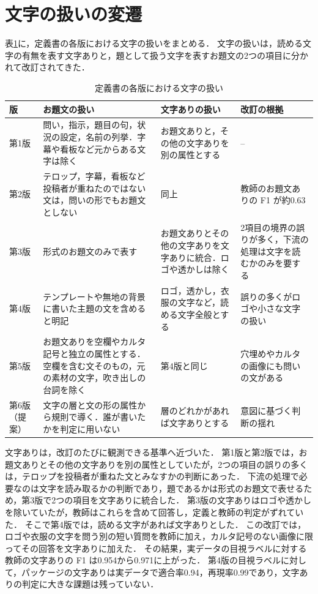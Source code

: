 \section{文字の扱いの変遷}
\label{sec_history}
表\ref{tab_history}に，定義書の各版における文字の扱いをまとめる．
文字の扱いは，読める文字の有無を表す文字ありと，題として扱う文字を表すお題文の2つの項目に分かれて改訂されてきた．

\begin{table}[t]
    \centering
    \caption{定義書の各版における文字の扱い}
    \label{tab_history}
    \small
    \begin{tabular}{>{\centering\arraybackslash}p{}>{\raggedright\arraybackslash}p{}>{\raggedright\arraybackslash}p{}>{\raggedright\arraybackslash}p{}}
        \toprule
        版 & お題文の扱い & 文字ありの扱い & 改訂の根拠 \\
        \midrule
        第1版 & 問い，指示，題目の句，状況の設定，名前の列挙．字幕や看板など元からある文字は除く & お題文ありと，その他の文字ありを別の属性とする & -- \\
        第2版 & テロップ，字幕，看板など投稿者が重ねたのではない文は，問いの形でもお題文としない & 同上 & 教師のお題文ありの F1 が約0.63 \\
        第3版 & 形式のお題文のみで表す & お題文ありとその他の文字ありを文字ありに統合．ロゴや透かしは除く & 2項目の境界の誤りが多く，下流の処理は文字を読むかのみを要する \\
        第4版 & テンプレートや無地の背景に書いた主題の文を含めると明記 & ロゴ，透かし，衣服の文字など，読める文字全般とする & 誤りの多くがロゴや小さな文字の扱い \\
        第5版 & お題文ありを空欄やカルタ記号と独立の属性とする．空欄を含む文そのもの，元の素材の文字，吹き出しの台詞を除く & 第4版と同じ & 穴埋めやカルタの画像にも問いの文がある \\
        第6版（提案） & 文字の層と文の形の属性から規則で導く．誰が書いたかを判定に用いない & 層のどれかがあれば文字ありとする & 意図に基づく判断の揺れ \\
        \bottomrule
    \end{tabular}
\end{table}

文字ありは，改訂のたびに観測できる基準へ近づいた．
第1版と第2版では，お題文ありとその他の文字ありを別の属性としていたが，2つの項目の誤りの多くは，テロップを投稿者が重ねた文とみなすかの判断にあった．
下流の処理で必要なのは文字を読み取るかの判断であり，題であるかは形式のお題文で表せるため，第3版で2つの項目を文字ありに統合した．
第3版の文字ありはロゴや透かしを除いていたが，教師はこれらを含めて回答し，定義と教師の判定がずれていた．
そこで第4版では，読める文字があれば文字ありとした．
この改訂では，ロゴや衣服の文字を問う別の短い質問を教師に加え，カルタ記号のない画像に限ってその回答を文字ありに加えた．
その結果，実データの目視ラベルに対する教師の文字ありの F1 は0.954から0.971に上がった．
第4版の目視ラベルに対して，パッケージの文字ありは実データで適合率0.94，再現率0.99であり，文字ありの判定に大きな課題は残っていない．

